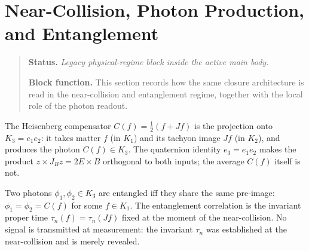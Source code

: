 
\section{Near-Collision, Photon Production, and Entanglement}
\begin{quote}\small
\noindent\textbf{Status.} \emph{Legacy physical-regime block inside the active main body.}\par
\noindent\textbf{Block function.} This section records how the same closure architecture is read in the near-collision and entanglement regime, together with the local role of the photon readout.
\end{quote}
\label{sec:entanglement}

\begin{proposition}\label{prop:compensator}
The Heisenberg compensator $C(f)=\tfrac{1}{2}(f+Jf)$ is the projection
onto $K_3=e_1 e_2$: it takes matter $f$ (in $K_1$) and its tachyon image
$Jf$ (in $K_2$), and produces the photon $C(f)\in K_3$.
The quaternion identity $e_3=e_1 e_2$ makes the product $z\times J_Bz=2E\times B$ orthogonal to both
inputs; the average $C(f)$ itself is not.
\end{proposition}


\begin{theorem}
\label{thm:entanglement-shared-time}
Two photons $\phi_1,\phi_2\in K_3$ are entangled iff they share the same
pre-image: $\phi_1=\phi_2=C(f)$ for some $f\in K_1$.
The entanglement correlation is the invariant proper time
$\tau_n(f)=\tau_n(Jf)$ fixed at the moment of the near-collision.
No signal is transmitted at measurement: the invariant $\tau_n$ was
established at the near-collision and is merely revealed.
\end{theorem}



